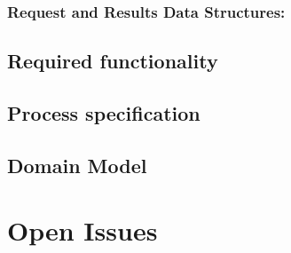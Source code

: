 \documentclass{article}
\begin{document}
		\subsubsection{Request and Results Data Structures:}
	\subsection{Required functionality}
	\subsection{Process specification}
	\subsection{Domain Model}
	
\section{Open Issues}
\end{document}
